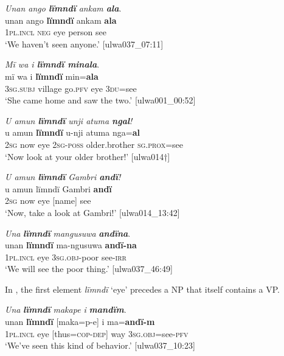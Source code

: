 \ea%
    \label{ex:phrase:59}
          \textit{Unan ango \textbf{lïmndï} ankam \textbf{ala}}.\\
\gll unan    ango  \textbf{lïmndï}   ankam  \textbf{ala}\\
    1\textsc{pl.incl}  \textsc{neg}  eye      person  see\\
\glt `We haven’t seen anyone.’ [ulwa037\_07:11]
\z

\ea%
    \label{ex:phrase:60}
          \textit{Mï wa i \textbf{lïmndï minala}}.\\
\gll mï      wa    i    \textbf{lïmndï}  min=\textbf{ala}\\
    3\textsc{sg.subj}  village  go.\textsc{pfv}  eye    3\textsc{du}=see\\
\glt `She came home and saw the two.’ [ulwa001\_00:52]
\z

\ea%
    \label{ex:phrase:61}
          \textit{U amun \textbf{lïmndï} unji atuma \textbf{ngal}!}\\
\gll    u    amun  \textbf{lïmndï}  u-nji    atuma      nga=\textbf{al}\\
    2\textsc{sg}  now  eye    2\textsc{sg-poss}  older.brother  \textsc{sg.prox}=see\\
\glt `Now look at your older brother!’ [ulwa014†]
\z

\ea%
    \label{ex:phrase:62}
          \textit{U amun \textbf{lïmndï} Gambri \textbf{andï}!}\\
\gll    u    amun  lïmndï  Gambri  \textbf{andï}\\
    2\textsc{sg}  now  eye    [name]    see\\
\glt `Now, take a look at Gambri!’ [ulwa014\_13:42]
\z

\ea%
    \label{ex:phrase:63}
          \textit{Una} \textbf{\textit{lïmndï}} \textit{mangusuwa} \textbf{\textit{andïna}}.\\
\gll unan    \textbf{lïmndï}  ma-ngusuwa  \textbf{andï-na}\\
    1\textsc{pl.incl}  eye    3\textsc{sg.obj-}poor  see{}-\textsc{irr}\\
\glt `We will see the poor thing.’ [ulwa037\_46:49]
\z

In , the first element \textit{lïmndï} ‘eye’ precedes a  NP that itself contains a VP.

\ea%
    \label{ex:phrase:64}
          \textit{Una} \textbf{\textit{lïmndï}} \textit{makape i} \textbf{\textit{mandïm}}.\\
\gll unan    \textbf{lïmndï}  [maka=p-e]    i    ma=\textbf{andï-m}\\
    1\textsc{pl.incl}  eye    [thus=\textsc{cop-dep]}  way  \textsc{3sg.obj}=see-\textsc{pfv}\\
\glt `We’ve seen this kind of behavior.’ [ulwa037\_10:23]
\z

